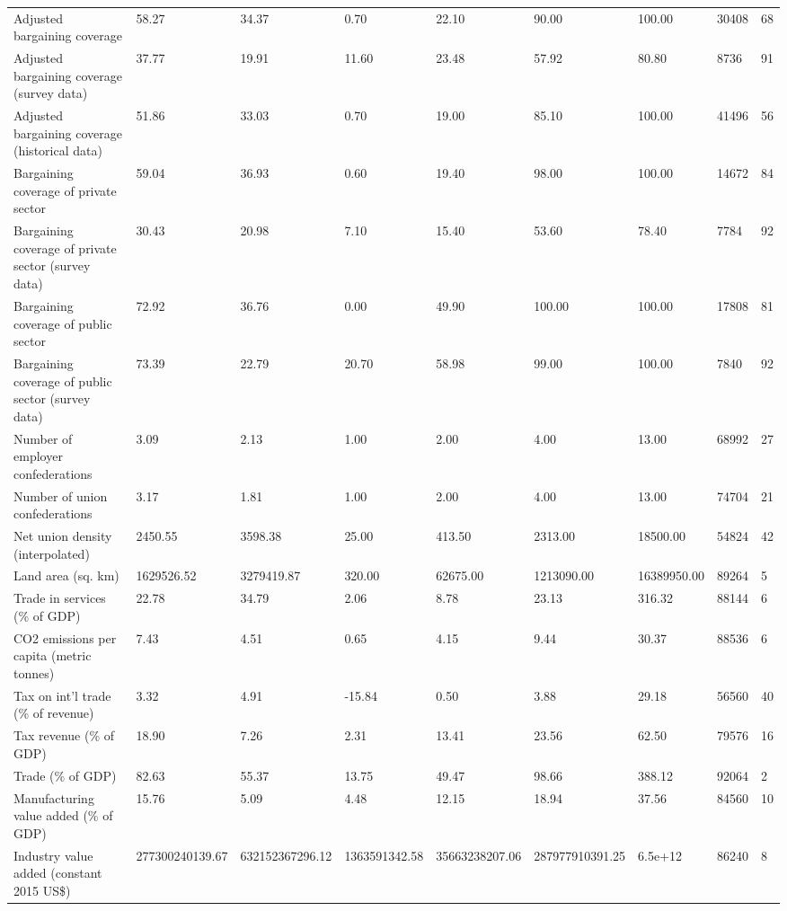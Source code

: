 \begin{longtable}{lllllllll}
Adjusted bargaining coverage & 58.27 & 34.37 & 0.70 & 22.10 & 90.00 & 100.00 & 30408 & 68\\
Adjusted bargaining coverage (survey data) & 37.77 & 19.91 & 11.60 & 23.48 & 57.92 & 80.80 & 8736 & 91\\
\addlinespace
Adjusted bargaining coverage (historical data) & 51.86 & 33.03 & 0.70 & 19.00 & 85.10 & 100.00 & 41496 & 56\\
Bargaining coverage of private sector & 59.04 & 36.93 & 0.60 & 19.40 & 98.00 & 100.00 & 14672 & 84\\
Bargaining coverage of private sector (survey data) & 30.43 & 20.98 & 7.10 & 15.40 & 53.60 & 78.40 & 7784 & 92\\
Bargaining coverage of public sector & 72.92 & 36.76 & 0.00 & 49.90 & 100.00 & 100.00 & 17808 & 81\\
Bargaining coverage of public sector (survey data) & 73.39 & 22.79 & 20.70 & 58.98 & 99.00 & 100.00 & 7840 & 92\\
\addlinespace
Number of employer confederations & 3.09 & 2.13 & 1.00 & 2.00 & 4.00 & 13.00 & 68992 & 27\\
Number of union confederations & 3.17 & 1.81 & 1.00 & 2.00 & 4.00 & 13.00 & 74704 & 21\\
Net union density (interpolated) & 2450.55 & 3598.38 & 25.00 & 413.50 & 2313.00 & 18500.00 & 54824 & 42\\
Land area (sq. km) & 1629526.52 & 3279419.87 & 320.00 & 62675.00 & 1213090.00 & 16389950.00 & 89264 & 5\\
Trade in services (\% of GDP) & 22.78 & 34.79 & 2.06 & 8.78 & 23.13 & 316.32 & 88144 & 6\\
\addlinespace
CO2 emissions per capita (metric tonnes) & 7.43 & 4.51 & 0.65 & 4.15 & 9.44 & 30.37 & 88536 & 6\\
Tax on int'l trade (\% of revenue) & 3.32 & 4.91 & -15.84 & 0.50 & 3.88 & 29.18 & 56560 & 40\\
Tax revenue (\% of GDP) & 18.90 & 7.26 & 2.31 & 13.41 & 23.56 & 62.50 & 79576 & 16\\
Trade (\% of GDP) & 82.63 & 55.37 & 13.75 & 49.47 & 98.66 & 388.12 & 92064 & 2\\
Manufacturing value added (\% of GDP) & 15.76 & 5.09 & 4.48 & 12.15 & 18.94 & 37.56 & 84560 & 10\\
\addlinespace
Industry value added (constant 2015 US\$) & 277300240139.67 & 632152367296.12 & 1363591342.58 & 35663238207.06 & 287977910391.25 & 6.5e+12 & 86240 & 8\\

\end{longtable}
